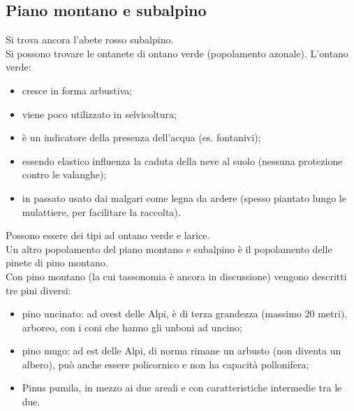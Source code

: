 \subsection{Piano montano e subalpino}
Si trova ancora l'abete rosso subalpino.\\
Si possono trovare le ontanete di ontano verde (popolamento azonale). L'ontano verde:
\begin{itemize}[nosep]
    \item cresce in forma arbustiva;
    \item viene poco utilizzato in selvicoltura;
    \item è un indicatore della presenza dell'acqua (es. fontanivi);
    \item essendo elastico influenza la caduta della neve al suolo (nessuna protezione contro le valanghe);
    \item in passato usato dai malgari come legna da ardere (spesso piantato lungo le mulattiere, per facilitare la raccolta).
\end{itemize}  
Possono essere dei tipi ad ontano verde e larice.\\
Un altro popolamento del piano montano e subalpino è il popolamento delle pinete di pino montano.\\
Con pino montano (la cui tassonomia è ancora in discussione) vengono descritti tre pini diversi:
\begin{itemize}[nosep]
    \item pino uncinato: ad ovest delle Alpi, è di terza grandezza (massimo 20 metri), arboreo, con i coni che hanno gli unboni ad uncino;
    \item pino mugo: ad est delle Alpi, di norma rimane un arbusto (non diventa un albero), può anche essere policornico e non ha capacità pollonifera;
    \item Pinus pumila, in mezzo ai due areali e con caratteristiche intermedie tra le due. 
\end{itemize} 
